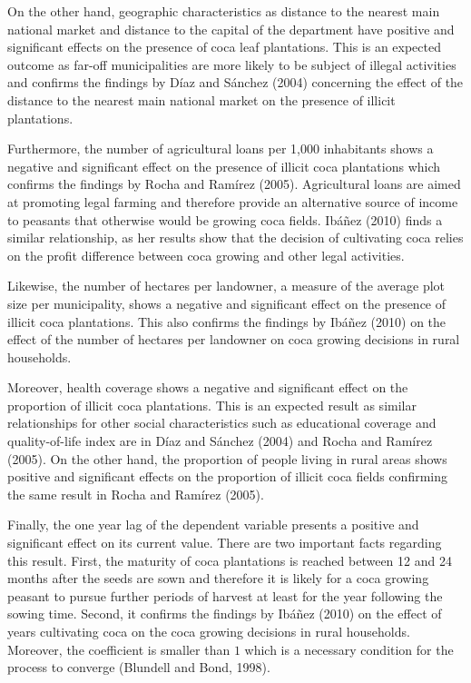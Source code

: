 \documentclass[12pt,a4paper,english]{article}%
\begin{document}
On the other hand, geographic characteristics as distance to the nearest main national market and distance to the capital of the department have positive and significant effects on the presence of coca leaf plantations. This is an expected outcome as far-off municipalities are more likely to be subject of illegal activities and confirms the findings by D\'{i}az and S\'{a}nchez (2004) concerning the effect of the distance to the nearest main national market on the presence of illicit plantations.

Furthermore, the number of agricultural loans per 1,000 inhabitants shows a negative and significant effect on the presence of illicit coca plantations which confirms the findings by Rocha and Ram\'{i}rez (2005). Agricultural loans are aimed at promoting legal farming and therefore provide an alternative source of income to peasants that otherwise would be growing coca fields. Ib\'{a}\~{n}ez (2010) finds a similar relationship, as her results show that the decision of cultivating coca relies on the profit difference between coca growing and other legal activities.

Likewise, the number of hectares per landowner, a measure of the average plot size per municipality, shows a negative and significant effect on the presence of illicit coca plantations. This also confirms the findings by Ib\'{a}\~{n}ez (2010) on the effect of the number of hectares per landowner on coca growing decisions in rural households.

Moreover, health coverage shows a negative and significant effect on the proportion of illicit coca plantations. This is an expected result as similar relationships for other social characteristics such as educational coverage and quality-of-life index are in D\'{i}az and S\'{a}nchez (2004) and Rocha and Ram\'{i}rez (2005). On the other hand, the proportion of people living in rural areas shows positive and significant effects on the proportion of illicit coca fields confirming the same result in Rocha and Ram\'{i}rez (2005).

Finally, the one year lag of the dependent variable presents a positive and significant effect on its current value. There are two important facts regarding this result. First, the maturity of coca plantations is reached between 12 and 24 months after the seeds are sown and therefore it is likely for a coca growing peasant to pursue further periods of harvest at least for the year following the sowing time. Second, it confirms the findings by Ib\'{a}\~{n}ez (2010) on the effect of years cultivating coca on the coca growing decisions in rural households. Moreover, the coefficient is smaller than $1$ which is a necessary condition for the process to converge (Blundell and Bond, 1998).
\end{document}
